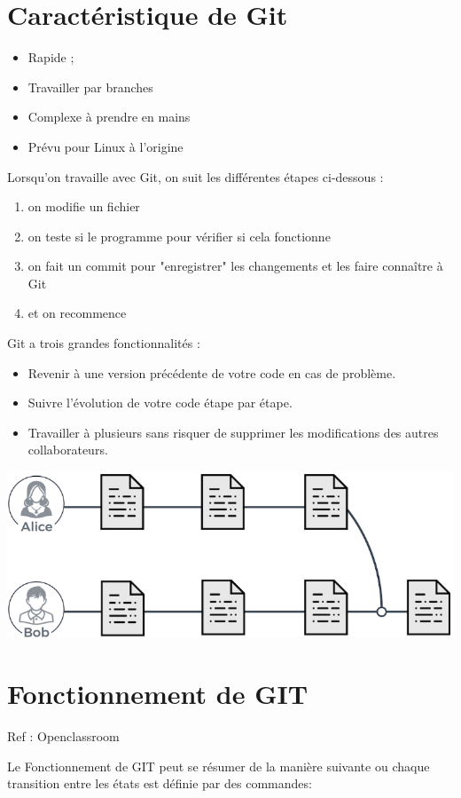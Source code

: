 \documentclass[french, 12pt]{article}%
\newcommand{\itemE}{\item[$\bullet$]}
\begin{document}
\section{Caractéristique de Git}
\begin{itemize}
\itemE Rapide ;
\itemE Travailler par branches
\itemE Complexe à prendre en mains 
\itemE Prévu pour Linux à l'origine
\end{itemize}

Lorsqu’on travaille avec Git, on suit les différentes étapes ci-dessous : 

\begin{enumerate}
\item on modifie un fichier
\item on teste si le programme pour vérifier si cela fonctionne
\item on fait un commit pour "enregistrer" les changements et les faire connaître à Git
\item et on recommence
\end{enumerate}



Git a trois grandes fonctionnalités :
\begin{itemize}
\itemE Revenir à une version précédente de votre code en cas de problème.
\itemE Suivre l’évolution de votre code étape par étape.
\itemE Travailler à plusieurs sans risquer de supprimer les modifications des autres collaborateurs. 
\end{itemize}

\begin{center}
\includegraphics[scale=0.7]{./ressource/alice_bob_git.png}
\end{center}


\section{Fonctionnement de GIT}
\tiny Ref : Openclassroom \normalsize

Le Fonctionnement de GIT peut se résumer de la manière suivante ou chaque transition entre les états est définie par des commandes: 
\end{document}
